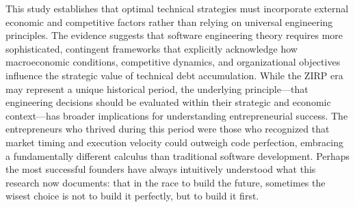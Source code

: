 This study establishes that optimal technical strategies must incorporate external economic and competitive factors rather than relying on universal engineering principles. The evidence suggests that software engineering theory requires more sophisticated, contingent frameworks that explicitly acknowledge how macroeconomic conditions, competitive dynamics, and organizational objectives influence the strategic value of technical debt accumulation. While the \ac{ZIRP} era may represent a unique historical period, the underlying principle—that engineering decisions should be evaluated within their strategic and economic context—has broader implications for understanding entrepreneurial success. The entrepreneurs who thrived during this period were those who recognized that market timing and execution velocity could outweigh code perfection, embracing a fundamentally different calculus than traditional software development. Perhaps the most successful founders have always intuitively understood what this research now documents: that in the race to build the future, sometimes the wisest choice is not to build it perfectly, but to build it first.